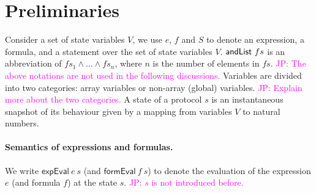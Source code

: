\documentclass{llncs}
\newcommand\JP[1]{\textcolor{magenta}{JP: #1}}
\begin{document}



\section{Preliminaries}
Consider a set of state variables $V$, we use $e$, $f$ and $S$ to denote an
expression, a formula, and a statement over the set of state
variables $V$. ${\sf andList}~fs$  is an abbreviation of
$fs_1\wedge...\wedge fs_n$, where $n$ is the number of elements in $fs$.
\JP{The above notations are not used in the following discussions.}
Variables are divided into two categories: array variables or
non-array (global) variables. \JP{Explain more about the two categories.} A state of a protocol $s$ is an
instantaneous snapshot of its behaviour given by a mapping from
variables $V$ to natural numbers.

\paragraph*{Semantics of expressions and formulas.}
We write
$\mathsf{expEval}~e~s$ (and $\mathsf{formEval}~f~s$) to denote the
evaluation of the expression $e$ (and formula $f$) at the state $s$.
\JP{$s$ is not introduced before.}
\end{document}
